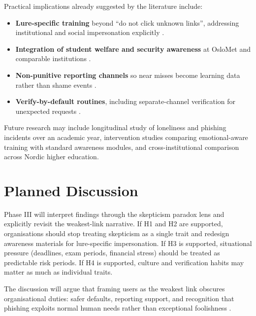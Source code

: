 \documentclass[UKenglish,12pt]{master-style}
\begin{document}
Practical implications already suggested by the literature include:
\begin{itemize}
    \item \textbf{Lure-specific training} beyond ``do not click unknown links'', addressing institutional and social impersonation explicitly \parencite{finansnorge2026svindel,nettvettPhishing}.
    \item \textbf{Integration of student welfare and security awareness} at OsloMet and comparable institutions \parencite{oslomet2024lunsjvenn,shot2022}.
    \item \textbf{Non-punitive reporting channels} so near misses become learning data rather than shame events \parencite{chen2024roleplaying}.
    \item \textbf{Verify-by-default routines}, including separate-channel verification for unexpected requests \parencite{nsm2026risk}.
\end{itemize}

Future research may include longitudinal study of loneliness and phishing incidents over an academic year, intervention studies comparing emotional-aware training with standard awareness modules, and cross-institutional comparison across Nordic higher education.

\chapter{Planned Discussion}
\label{ch:planned-discussion}

Phase III will interpret findings through the skepticism paradox lens and explicitly revisit the weakest-link narrative. If H1 and H2 are supported, organisations should stop treating skepticism as a single trait and redesign awareness materials for lure-specific impersonation. If H3 is supported, situational pressure (deadlines, exam periods, financial stress) should be treated as predictable risk periods. If H4 is supported, culture and verification habits may matter as much as individual traits.

The discussion will argue that framing users as the weakest link obscures organisational duties: safer defaults, reporting support, and recognition that phishing exploits normal human needs rather than exceptional foolishness \parencite{hadnagy2018social,chen2024roleplaying}.

\backmatter
\printbibliography
\end{document}
